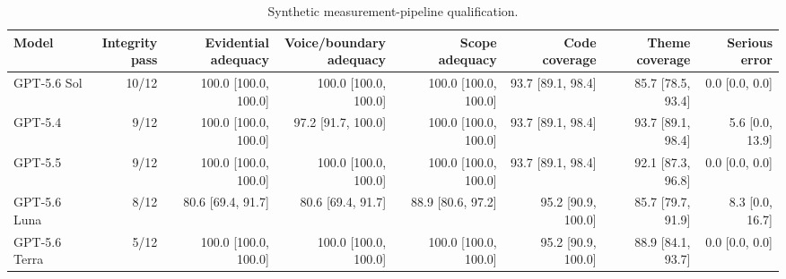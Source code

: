 \begin{table}[t]
\centering
\scriptsize
\setlength{\tabcolsep}{2.3pt}
\begin{tabular}{lrrrrrrr}
\toprule
Model & \shortstack{Integrity\\pass} & \shortstack{Evidential\\adequacy} & \shortstack{Voice/boundary\\adequacy} & \shortstack{Scope\\adequacy} & \shortstack{Code\\coverage} & \shortstack{Theme\\coverage} & \shortstack{Serious\\error} \\
\midrule
GPT-5.6 Sol & 10/12 & 100.0 [100.0, 100.0] & 100.0 [100.0, 100.0] & 100.0 [100.0, 100.0] & 93.7 [89.1, 98.4] & 85.7 [78.5, 93.4] & 0.0 [0.0, 0.0] \\
GPT-5.4 & 9/12 & 100.0 [100.0, 100.0] & 97.2 [91.7, 100.0] & 100.0 [100.0, 100.0] & 93.7 [89.1, 98.4] & 93.7 [89.1, 98.4] & 5.6 [0.0, 13.9] \\
GPT-5.5 & 9/12 & 100.0 [100.0, 100.0] & 100.0 [100.0, 100.0] & 100.0 [100.0, 100.0] & 93.7 [89.1, 98.4] & 92.1 [87.3, 96.8] & 0.0 [0.0, 0.0] \\
GPT-5.6 Luna & 8/12 & 80.6 [69.4, 91.7] & 80.6 [69.4, 91.7] & 88.9 [80.6, 97.2] & 95.2 [90.9, 100.0] & 85.7 [79.7, 91.9] & 8.3 [0.0, 16.7] \\
GPT-5.6 Terra & 5/12 & 100.0 [100.0, 100.0] & 100.0 [100.0, 100.0] & 100.0 [100.0, 100.0] & 95.2 [90.9, 100.0] & 88.9 [84.1, 93.7] & 0.0 [0.0, 0.0] \\
\bottomrule
\end{tabular}
\caption{Synthetic measurement-pipeline qualification.}
\label{tab:synthetic_paper_metrics}
\end{table}
